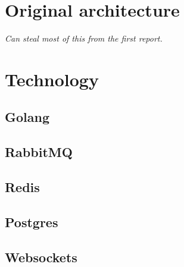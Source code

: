 \section{Original architecture}
\textit{Can steal most of this from the first report.}

\section{Technology}

\subsection{Golang}

\subsection{RabbitMQ}

\subsection{Redis}

\subsection{Postgres}

\subsection{Websockets}